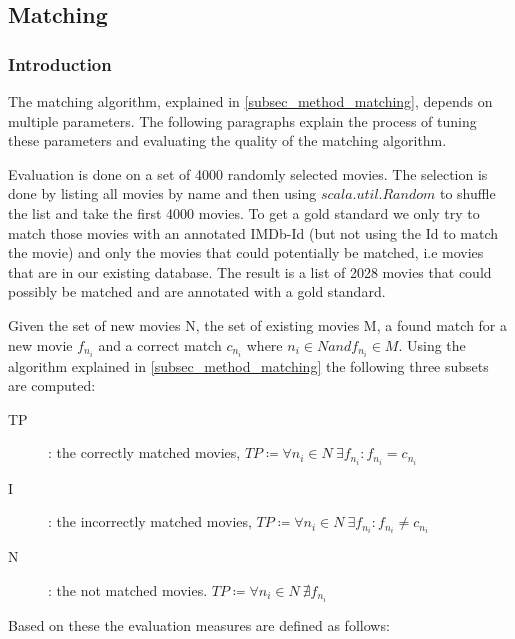 \subsection{Matching}
\label{subsec_evaluation_matching}

\subsubsection{Introduction}
The matching algorithm, explained in \ref{subsec_method_matching}, depends on multiple parameters. The following paragraphs explain the process of tuning these parameters and evaluating the quality of the matching algorithm.

Evaluation is done on a set of 4000 randomly selected movies. The selection is done by listing all movies by name and then using $scala.util.Random$ to shuffle the list and take the first 4000 movies. To get a gold standard we only try to match those movies with an annotated IMDb-Id (but not using the Id to match the movie) and only the movies that could potentially be matched, i.e movies that are in our existing database. The result is a list of 2028 movies that could possibly be matched and are annotated with a gold standard.

Given the set of new movies N, the set of existing movies M, a found match for a new movie $f_{n_{i}}$ and a correct match $c_{n_{i}}$ where $n_{i} \in N and f_{n_{i}} \in M$. Using the algorithm explained in \ref{subsec_method_matching} the following three subsets are computed:

\begin{description}
\item[TP]: the correctly matched movies,
\begin{math}
TP \coloneqq \forall n_{i} \in N ~\exists f_{n_{i}}: f_{n_{i}} = c_{n_{i}}
\end{math}
\item[I]: the incorrectly matched movies,
\begin{math}
TP \coloneqq \forall n_{i} \in N ~\exists f_{n_{i}}: f_{n_{i}} \neq c_{n_{i}}
\end{math}
\item[N]: the not matched movies.
\begin{math}
TP \coloneqq \forall n_{i} \in N ~\nexists f_{n_{i}}
\end{math}
\end{description}

Based on these the evaluation measures are defined as follows:

